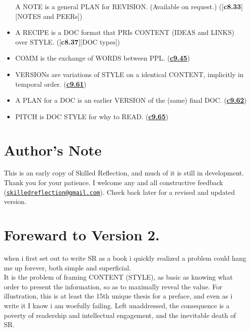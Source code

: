 \documentclass[
]{book}
\begin{document}
\begin{itemize}
  A NOTE is a general PLAN for REVISION. (Available on request.) ({[}\textbf{c8.33}{]}{[}NOTES and PEERs{]})\\
\item
  A RECIPE is a DOC format that PRIs CONTENT (IDEAS and LINKS) over STYLE. ({[}\textbf{c8.37}{]}{[}DOC types{]})\\
\item
  COMM is the exchange of WORDS between PPL. (\protect\hyperlink{style}{\textbf{c9.45}})\\
\item
  VERSIONs are variations of STYLE on a identical CONTENT, implicitly in temporal order. (\protect\hyperlink{pris-differ}{\textbf{c9.61}})\\
\item
  A PLAN for a DOC is an earlier VERSION of the (same) final DOC. (\protect\hyperlink{pris-differ}{\textbf{c9.62}})\\
\item
  PITCH is DOC STYLE for why to READ. (\protect\hyperlink{norms-style}{\textbf{c9.65}})
\end{itemize}

\hypertarget{authors-note}{%
\section{Author's Note}\label{authors-note}}

This is an early copy of Skilled Reflection, and much of it is still in development. Thank you for your patience. I welcome any and all constructive feedback (\href{mailto:skilledreflection@gmail.com}{\nolinkurl{skilledreflection@gmail.com}}). Check back later for a revised and updated version.

\hypertarget{foreward-to-version-2.}{%
\section{Foreward to Version 2.}\label{foreward-to-version-2.}}

when i first set out to write SR as a book i quickly realized a problem could hang me up forever, both simple and superficial.\\
It is the problem of framing CONTENT (STYLE), as basic as knowing what order to present the information, so as to maximally reveal the value.
For illustration, this is at least the 15th unique thesis for a preface, and even as i write it I know i am woefully failing.
Left unaddressed, the consequence is a poverty of readership and intellectual engagement, and the inevitable death of SR.
\end{document}
